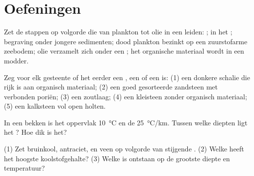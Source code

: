\section{Oefeningen}

\begin{exercise}[$\star$]\label{exo:g11:fossil-fuel-geology:1}
Zet de stappen op volgorde die van plankton tot olie in een  leiden: ;
 in het ; begraving onder jongere sedimenten; dood plankton
bezinkt op een zuurstofarme zeebodem; olie verzamelt zich onder een ; het organische
materiaal wordt  in een modder.
\end{exercise}

\begin{exercise}[$\star$]\label{exo:g11:fossil-fuel-geology:2}
Zeg voor elk gesteente of het eerder een , een 
of een  is: (1) een donkere schalie die rijk is aan organisch materiaal; (2) een goed gesorteerde
zandsteen met verbonden poriën; (3) een zoutlaag; (4) een kleisteen zonder
organisch materiaal; (5) een kalksteen vol open holten.
\end{exercise}

\begin{exercise}[$\star$]\label{exo:g11:fossil-fuel-geology:3}
In een bekken is het oppervlak \qty{10}{\degreeCelsius} en de  \qty{25}{\degreeCelsius/km}. Tussen welke diepten ligt het
? Hoe dik is het?
\end{exercise}

\begin{exercise}[$\star$]\label{exo:g11:fossil-fuel-geology:4}
(1) Zet bruinkool, antraciet,  en veen op volgorde van stijgende
. (2) Welke heeft het hoogste koolstofgehalte? (3) Welke is ontstaan op de
grootste diepte en temperatuur?
\end{exercise}

